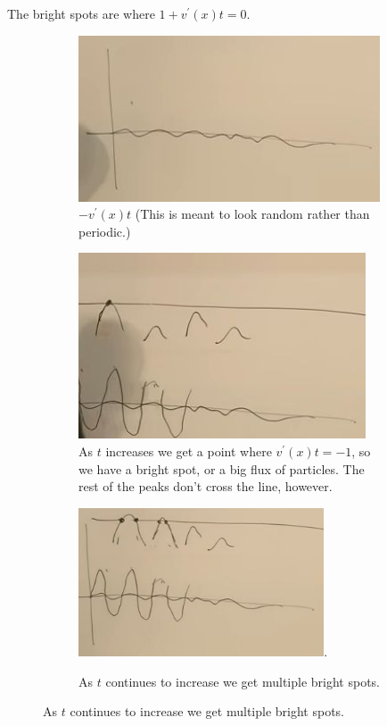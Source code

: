 \documentclass[]{article}
\begin{document}
The bright spots are where $1+v^{\prime}(x)t=0$.

\begin{figure}[H]
	\caption{When does $1+v^{\prime}(x)t=0$?}
	\begin{subfigure}[t]{0.3\textwidth}
		\caption{$-v^{\prime}(x)t$ (This is meant to look random rather than periodic.)}
		\includegraphics[width=\textwidth]{cosmo-9-v-prime}
	\end{subfigure}
	\begin{subfigure}[t]{0.3\textwidth}
		\caption{As $t$ increases we get a point where $v^{\prime}(x)t=-1$, so we have a bright spot, or a big flux of particles. The rest of the peaks don't cross the line, however.}
		\includegraphics[width=\textwidth]{cosmo-9-v-prime-eventually}
	\end{subfigure}
	\begin{subfigure}[t]{0.3\textwidth}
		\caption{As $t$ continues to increase we get multiple bright spots.}
		\includegraphics[width=0.8\textwidth]{cosmo-9-with-caustics}.
	\end{subfigure}
\end{figure}
\end{document}
